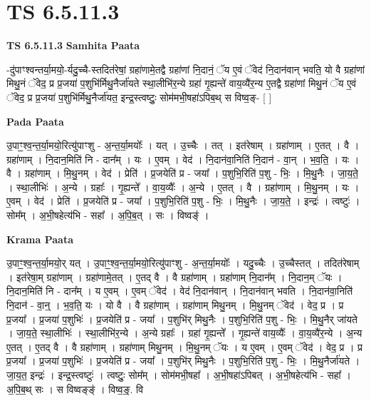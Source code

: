 \documentclass[17pt]{extarticle}
\begin{document}
\section{ TS 6.5.11.3 }

\textbf{TS 6.5.11.3 } \newline
\textbf{Samhita Paata} \newline

-दु॑पाꣳश्वन्तर्या॒मयो॒-र्यदु॒च्चै-स्तदित॑रेषां॒ ग्रहा॑णामे॒तद्वै ग्रहा॑णां नि॒दानं॒ ॅय ए॒वं ॅवेद॑ नि॒दान॑वान् भवति॒ यो वै ग्रहा॑णां मिथु॒नं ॅवेद॒ प्र प्र॒जया॑ प॒शुभि॑र्मिथु॒नैर्जा॑यते स्था॒लीभि॑र॒न्ये ग्रहा॑ गृ॒ह्यन्ते॑ वाय॒व्यै॑र॒न्य ए॒तद्वै ग्रहा॑णां मिथु॒नं ॅय ए॒वं ॅवेद॒ प्र प्र॒जया॑ प॒शुभि॑र्मिथु॒नैर्जा॑यत॒ इन्द्र॒स्त्वष्टुः॒ सोम॑मभी॒षहा॑ऽपिब॒थ् स विष्व॒ङ्- [  ] \newline

\textbf{Pada Paata} \newline

उ॒पाꣳ॒॒श्व॒न्त॒र्या॒मयो॒रित्यु॑पाꣳशु - अ॒न्त॒र्या॒मयोः᳚ । यत् । उ॒च्चैः । तत् । इत॑रेषाम् । ग्रहा॑णाम् । ए॒तत् । वै । ग्रहा॑णाम् । नि॒दान॒मिति॑ नि - दान᳚म् । यः । ए॒वम् । वेद॑ । नि॒दान॑वा॒निति॑ नि॒दान॑ - वा॒न् । भ॒व॒ति॒ । यः । वै । ग्रहा॑णाम् । मि॒थु॒नम् । वेद॑ । प्रेति॑ । प्र॒जयेति॑ प्र - जया᳚ । प॒शुभि॒रिति॑ प॒शु - भिः॒ । मि॒थु॒नैः । जा॒य॒ते॒ । स्था॒लीभिः॑ । अ॒न्ये । ग्रहाः᳚ । गृ॒ह्यन्ते᳚ । वा॒य॒व्यैः᳚ । अ॒न्ये । ए॒तत् । वै । ग्रहा॑णाम् । मि॒थु॒नम् । यः । ए॒वम् । वेद॑ । प्रेति॑ । प्र॒जयेति॑ प्र - जया᳚ । प॒शुभि॒रिति॑ प॒शु - भिः॒ । मि॒थु॒नैः । जा॒य॒ते॒ । इन्द्रः॑ । त्वष्टुः॑ । सोम᳚म् । अ॒भी॒षहेत्य॑भि - सहा᳚ । अ॒पि॒ब॒त् । सः । विष्वङ्॑ ।  \newline


\textbf{Krama Paata} \newline

उ॒पाꣳ॒॒श्व॒न्त॒र्या॒मयो॒र् यत् । उ॒पाꣳ॒॒श्व॒न्त॒र्या॒मयो॒रित्यु॑पाꣳशु - अ॒न्त॒र्या॒मयोः᳚ । यदु॒च्चैः । उ॒च्चैस्तत् । तदित॑रेषाम् । इत॑रेषा॒म् ग्रहा॑णाम् । ग्रहा॑णामे॒तत् । ए॒तद् वै । वै ग्रहा॑णाम् । ग्रहा॑णाम् नि॒दान᳚म् । नि॒दान॒म् ॅयः । नि॒दान॒मिति॑ नि - दान᳚म् । य ए॒वम् । ए॒वम् ॅवेद॑ । वेद॑ नि॒दान॑वान् । नि॒दान॑वान् भवति । नि॒दान॑वा॒निति॑ नि॒दान॑ - वा॒न्॒ । भ॒व॒ति॒ यः । यो वै । वै ग्रहा॑णाम् । ग्रहा॑णाम् मिथु॒नम् । मि॒थु॒नम् ॅवेद॑ । वेद॒ प्र । प्र प्र॒जया᳚ । प्र॒जया॑ प॒शुभिः॑ । प्र॒जयेति॑ प्र - जया᳚ । प॒शुभि॑र् मिथु॒नैः । प॒शुभि॒रिति॑ प॒शु - भिः॒ । मि॒थु॒नैर् जा॑यते । जा॒य॒ते॒ स्था॒लीभिः॑ । स्था॒लीभि॑र॒न्ये । अ॒न्ये ग्रहाः᳚ । ग्रहा॑ गृ॒ह्यन्ते᳚ । गृ॒ह्यन्ते॑ वाय॒व्यैः᳚ । वा॒य॒व्यै॑र॒न्ये । अ॒न्य ए॒तत् । ए॒तद् वै । वै ग्रहा॑णाम् । ग्रहा॑णाम् मिथु॒नम् । मि॒थु॒नम् ॅयः । य ए॒वम् । ए॒वम् ॅवेद॑ । वेद॒ प्र । प्र प्र॒जया᳚ । प्र॒जया॑ प॒शुभिः॑ । प्र॒जयेति॑ प्र - जया᳚ । प॒शुभि॑र् मिथु॒नैः । प॒शुभि॒रिति॑ प॒शु - भिः॒ । मि॒थु॒नैर्जा॑यते । जा॒य॒त॒ इन्द्रः॑ । इन्द्र॒स्त्वष्टुः॑ । त्वष्टुः॒ सोम᳚म् । सोम॑मभी॒षहा᳚ । अ॒भी॒षहा॑ऽपिबत् । अ॒भी॒षहेत्य॑भि - सहा᳚ । अ॒पि॒ब॒थ् सः । स विष्वङ्‍ङ्॑ । विष्व॒ङ्॒. वि \newline
\end{document}
